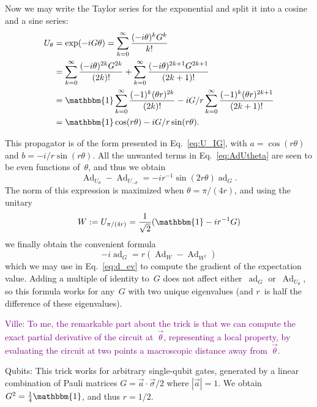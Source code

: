 \documentclass[aps,pra,10pt,twocolumn,groupedaddress,nofootinbib]{revtex4-1}
\theoremstyle{plain}
\DeclareMathOperator{\Ad}{Ad}
\DeclareMathOperator{\ad}{ad}
\newcommand{\be}{\begin{equation}}
\newcommand{\ee}{\end{equation}}
\newcommand{\I}{\mathbbm{1}} %
\newcommand{\ville}[1]{\textcolor{purple}{Ville: #1}}
\begin{document}
Now we may write the Taylor series for the exponential
and split it into a cosine and a sine series:
\begin{align*}
U_\theta &= \exp(-iG\theta) = \sum_{k=0}^\infty \frac{(-i\theta)^k G^k}{k!}\\
&=
\sum_{k=0}^\infty \frac{(-i\theta)^{2k} G^{2k}}{(2k)!}
+\sum_{k=0}^\infty \frac{(-i\theta)^{2k+1} G^{2k+1}}{(2k+1)!}\\
&=
\I \sum_{k=0}^\infty \frac{(-1)^{k} (\theta r)^{2k}}{(2k)!}
-i G/r \sum_{k=0}^\infty \frac{(-1)^{k} (\theta r)^{2k+1}}{(2k+1)!}\\
&=
\I \cos(r \theta)
-i G/r \sin(r \theta).
\end{align*}



This propagator is of the form presented in Eq.~\eqref{eq:U_IG},
with $a=\cos(r\theta)$ and $b=-i/r \sin(r\theta)$.
All the unwanted terms in Eq.~\eqref{eq:AdUtheta} are seen to be even functions of~$\theta$,
and thus we obtain
\be
\Ad_{U_\theta} -\Ad_{U_{-\theta}}
=
-i r^{-1} \sin(2r\theta) \ad_G.
\ee
The norm of this expression is maximized when $\theta = \pi/(4r)$,
and using the unitary
\be
W := U_{\pi/(4r)} = \frac{1}{\sqrt{2}}(\I -ir^{-1}G)
\ee
we finally obtain the convenient formula
\be
\label{eq:adAdformula}
-i\ad_G = r(\Ad_W-\Ad_{W^\dagger})
\ee
which we may use in Eq.~\eqref{eq:d_ev} to compute the gradient of the expectation value.
Adding a multiple of identity to~$G$ does not affect either~$\ad_G$ or~$\Ad_{U_{\theta}}$,
so this formula works for any~$G$ with two unique eigenvalues (and $r$~is half the difference of these eigenvalues).

\ville{To me, the remarkable part about the trick is that we can compute the exact partial derivative of the circuit at~$\vec{\theta}$,
  representing a local property, by evaluating the circuit at two points a macroscopic distance away from~$\vec{\theta}$.}


Qubits:
This trick works for arbitrary single-qubit gates, generated by a linear combination of Pauli matrices
$G = \vec{a} \cdot \vec{\sigma}/2$
where $|\vec{a}|=1$.
We obtain $G^2 = \frac{1}{4} \I$, and thus $r=1/2$.
\end{document}
